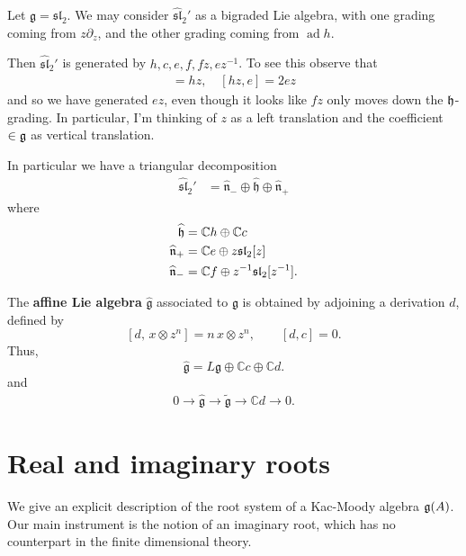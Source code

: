\documentclass[12pt]{article}
\begin{document}
\begin{example}
    Let $\mathfrak{g} = \mathfrak{sl}_2$. We may consider $\widehat{\mathfrak{sl}}_2'$ as a bigraded Lie algebra, with one grading coming from $z\partial_z$, and the other grading coming from $\operatorname{ad} h$.

    Then $\widehat{\mathfrak{sl}}_2'$ is generated by $h, c, e, f, fz, ez^{-1}$. To see this observe that \begin{align*}
        [fz,e] = hz, \quad [hz,e] = 2ez
    \end{align*} and so we have generated $ez$, even though it looks like $fz$ only moves down the $\mathfrak{h}$-grading. In particular, I'm thinking of $z$ as a left translation and the coefficient $\in \mathfrak{g}$ as vertical translation.

    In particular we have a triangular decomposition \begin{align*}
        \widehat{\mathfrak{sl}}_2' & = \widehat{\mathfrak{n}}_- \oplus \widehat{\mathfrak{h}} \oplus \widehat{\mathfrak{n}}_+
    \end{align*} where \begin{align*}
        \widehat{\mathfrak{h}}          & = \mathbb{C}h \oplus \mathbb{C}c                    \\
        \widehat{\mathfrak{n}}_+ & = \mathbb{C}e \oplus z\mathfrak{sl}_2[z]            \\
        \widehat{\mathfrak{n}}_- & = \mathbb{C}f \oplus z^{-1}\mathfrak{sl}_2[z^{-1}].
    \end{align*}
\end{example}

\begin{definition}
    The \textbf{affine Lie algebra} $\widehat{\mathfrak{g}}$ associated to $\mathfrak{g}$ is obtained by adjoining a derivation $d$, defined by
    \[
        [d,\, x \otimes z^n] = n\,x \otimes z^n,
        \qquad [d,c]=0.
    \]
    Thus,
    \[
        \widehat{\mathfrak{g}} = L\mathfrak{g} \oplus \mathbb{C}c \oplus \mathbb{C}d.
    \] and \begin{align*}
        0 \to \widehat{\mathfrak{g}} \to \widetilde{\mathfrak{g}} \to \mathbb{C}d \to 0.
    \end{align*}
\end{definition}

\section{Real and imaginary roots}
We give an explicit description of the root system of a Kac-Moody algebra $\mathfrak{g}(A)$. Our main instrument is the notion of an imaginary root, which has no counterpart in the finite dimensional theory.
\end{document}
